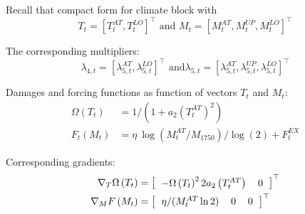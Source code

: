 \documentclass[xcolor=x11names,compress,aspectratio=169]{beamer}%
\makeatletter
\renewenvironment{itemize}{\begin{compactitemize}[<+-| alert@+>]}{\end{compactitemize}}
\makeatother
\begin{document}
\begin{frame}%


\begin{itemize}
\item Recall that compact form for climate block with
\[
T_{t}=[T_{t}^{AT},T_{t}^{LO}]^{\top}\text{ and }M_{t}=[M_{t}^{AT},M_{t}%
^{UP},M_{t}^{LO}]^{\top}%
\]


\item The corresponding multipliers:%
\[
\lambda_{4,t}=[\lambda_{5,t}^{AT},\lambda_{5,t}^{LO}]^{\top}\text{ \ and
}\lambda_{5,t}=[\lambda_{5,t}^{AT},\lambda_{5,t}^{UP},\lambda_{5,t}%
^{LO}]^{\top}%
\]


\item Damages and forcing functions as function of vectors $T_{t}$ and
$M_{t}:$
\begin{align*}
\Omega\left(  T_{t}\right)    & =1/\left(  1+a_{2}\left(  T_{t}^{AT}\right)
^{2}\right)  \\
F_{t}\left(  M_{t}\right)    & =\eta\ \log\left(  M_{t}^{AT}/M_{1750}\right)
/\log(2)+F_{t}^{EX}%
\end{align*}


\item Corresponding gradients:
\begin{align*}
\nabla_{T}\Omega\left(  T_{t}\right)    & =\left[
\begin{tabular}
[c]{ll}%
$-\Omega\left(  T_{t}\right)  ^{2}2a_{2}\left(  T_{t}^{AT}\right)  $ & $0$%
\end{tabular}
\right]  ^{\top}\\
\nabla_{M}F\left(  M_{t}\right)    & =\left[
\begin{tabular}
[c]{lll}%
$\eta/(M_{t}^{AT}\ln2)$ & $0$ & $0$%
\end{tabular}
\right]  ^{\top}%
\end{align*}

\end{itemize}%

\transboxout
\end{frame}%


%
\end{document}
